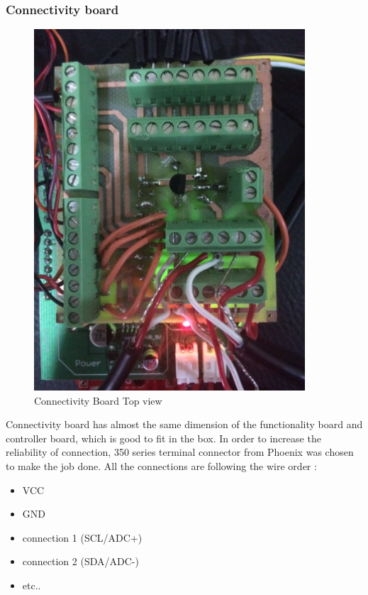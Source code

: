     \subsubsection{Connectivity board}
    \begin{figure}[H]
    \centering
    \includegraphics[width=0.9\textwidth]{con_board_top.jpg}
    \caption{\label{fig:Con Board}Connectivity Board Top view}
    \end{figure}

    Connectivity board has almost the same dimension of the functionality board and controller board, which is good to fit in the box. In order to increase the reliability of connection, 350 series terminal connector from Phoenix was chosen to make the job done. All the connections are following the wire order :\\
    \begin{itemize}
    \item VCC
    \item GND
    \item connection 1 (SCL/ADC+)
    \item connection 2 (SDA/ADC-)
    \item etc..
    \end{itemize}

